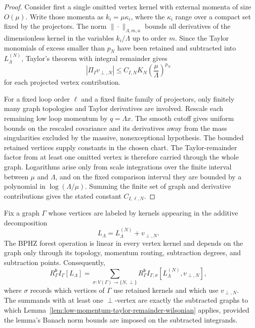 \begin{proof}
Consider first a single omitted vertex kernel with external momenta of size
\(O(\mu)\).  Write those momenta as \(k_i=\mu \kappa_i\), where the
\(\kappa_i\) range over a compact set fixed by the projectors.  The norm
\(\|\cdot\|_{\Lambda,m,a}\) bounds all derivatives of the dimensionless
kernel in the variables \(k_i/\Lambda\) up to order \(m\).  Since the Taylor
monomials of excess smaller than \(p_N\) have been retained and subtracted
into \(L_\Lambda^{(N)}\), Taylor's theorem with integral remainder gives
\[
  |\Pi_I v_{\perp,N}|
  \leq
  C_{I,N}K_N
  \left(\frac{\mu}{\Lambda}\right)^{p_N}
\]
for each projected vertex contribution.

For a fixed loop order \(\ell\) and a fixed finite family of projectors, only
finitely many graph topologies and Taylor derivatives are involved.  Rescale
each remaining low loop momentum by \(q=\Lambda x\).  The smooth cutoff gives
uniform bounds on the rescaled covariance and its derivatives away from the
mass singularities excluded by the massive, nonexceptional hypothesis.  The
bounded retained vertices supply constants in the chosen chart.  The
Taylor-remainder factor from at least one omitted vertex is therefore carried
through the whole graph.  Logarithms arise only from scale integrations over
the finite interval between \(\mu\) and \(\Lambda\), and on the fixed
comparison interval they are bounded by a polynomial in \(\log(\Lambda/\mu)\).
Summing the finite set of graph and derivative contributions gives the stated
constant \(C_{I,\ell,N}\).
\end{proof}

\begin{lemma}
\label{lem:bphz-commutes-with-wilsonian-vertex-split}
Fix a graph \(\Gamma\) whose vertices are labeled by kernels appearing in the
additive decomposition
\[
  L_\Lambda=L_\Lambda^{(N)}+v_{\perp,N}.
\]
The BPHZ forest operation is linear in every vertex kernel and depends on the
graph only through its topology, momentum routing, subtraction degrees, and
subtraction points.  Consequently,
\begin{equation}
  R_\Gamma^{\mathfrak b}I_\Gamma[L_\Lambda]
  =
  \sum_{\sigma:V(\Gamma)\to\{N,\perp\}}
  R_\Gamma^{\mathfrak b}
  I_{\Gamma,\sigma}[L_\Lambda^{(N)},v_{\perp,N}],
  \label{eq:forest-vertex-split-linearity}
\end{equation}
where \(\sigma\) records which vertices of \(\Gamma\) use retained kernels
and which use \(v_{\perp,N}\).  The summands with at least one
\(\perp\)-vertex are exactly the subtracted graphs to which
Lemma~\ref{lem:low-momentum-taylor-remainder-wilsonian} applies, provided the
lemma's Banach norm bounds are imposed on the subtracted integrands.
\end{lemma}

